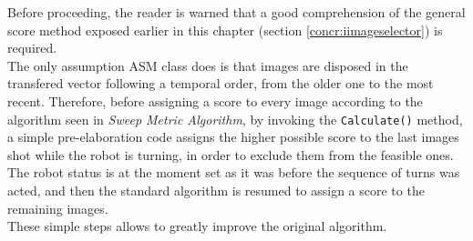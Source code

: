Before proceeding, the reader is warned that a good comprehension
of the general score method exposed earlier in this chapter
(section \ref{concr:iimageselector}) is required.
\\
The only assumption ASM class does is that images are disposed in
the transfered vector following a temporal order, from the older one
to the most recent. Therefore, before assigning a score
to every image according to the algorithm seen in \textit{Sweep Metric 
Algorithm}, by invoking the \texttt{Calculate()} method,
a simple pre-elaboration code assigns the higher
possible score to the last images shot while the robot is turning,
in order to exclude them from the feasible ones.
\\
The robot status is at the moment set
as it was before the sequence of turns was acted, and then the 
standard algorithm is resumed to assign a score
to the remaining images.
\\
These simple steps allows to greatly improve the original algorithm. 
